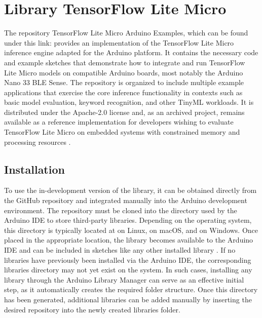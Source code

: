 %
%


\chapter{Library TensorFlow Lite Micro}
\label{TensorFlowLiteMicroInstall}

The repository TensorFlow Lite Micro Arduino Examples, which can be found under this link:  provides an implementation of the TensorFlow Lite Micro inference engine adapted for the Arduino platform. It contains the necessary code and example sketches that demonstrate how to integrate and run TensorFlow Lite Micro models on compatible Arduino boards, most notably the Arduino Nano 33 BLE Sense. The repository is organized to include multiple example applications that exercise the core inference functionality in contexts such as basic model evaluation, keyword recognition, and other TinyML workloads. It is distributed under the Apache-2.0 license and, as an archived project, remains available as a reference implementation for developers wishing to evaluate TensorFlow Lite Micro on embedded systems with constrained memory and processing resources \cite{ArduinoTensorFlow:2025}. 



\section{Installation}
To use the in-development version of the library, it can be obtained directly from the GitHub repository and integrated manually into the Arduino development environment. The repository must be cloned into the directory used by the Arduino IDE to store third-party libraries. Depending on the operating system, this directory is typically located at  on Linux,  on macOS, and  on Windows. Once placed in the appropriate location, the library becomes available to the Arduino IDE and can be included in sketches like any other installed library \cite{ArduinoTensorFlow:2025}. If no libraries have previously been installed via the Arduino IDE, the corresponding libraries directory may not yet exist on the system. In such cases, installing any library through the Arduino Library Manager can serve as an effective initial step, as it automatically creates the required folder structure. Once this directory has been generated, additional libraries can be added manually by inserting the desired repository into the newly created libraries folder.

